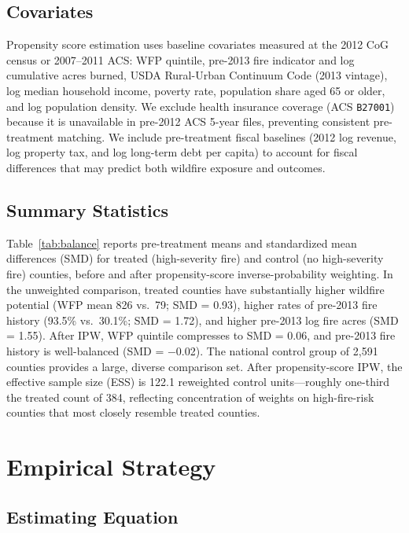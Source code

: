 \documentclass[12pt]{article}
\begin{document}
\subsection{Covariates}

Propensity score estimation uses baseline covariates measured at the 2012 CoG census
or 2007--2011 ACS: WFP quintile, pre-2013 fire indicator and log cumulative acres
burned, USDA Rural-Urban Continuum Code (2013 vintage), log median household income,
poverty rate, population share aged 65 or older, and log population density.
We exclude health insurance coverage (ACS \texttt{B27001}) because it is unavailable
in pre-2012 ACS 5-year files, preventing consistent pre-treatment matching. We
include pre-treatment fiscal baselines (2012 log revenue, log property tax, and log
long-term debt per capita) to account for fiscal differences that may predict both
wildfire exposure and outcomes.

\subsection{Summary Statistics}

Table~\ref{tab:balance} reports pre-treatment means and standardized mean differences
(SMD) for treated (high-severity fire) and control (no high-severity fire) counties,
before and after propensity-score inverse-probability weighting. In the unweighted
comparison, treated counties have substantially higher wildfire potential (WFP mean
826 vs.\ 79; SMD = 0.93), higher rates of pre-2013 fire history (93.5\% vs.\ 30.1\%;
SMD = 1.72), and higher pre-2013 log fire acres (SMD = 1.55). After IPW, WFP quintile
compresses to SMD = 0.06, and pre-2013 fire history is well-balanced (SMD = $-$0.02).
The national control group of 2,591 counties provides a large, diverse comparison
set. After propensity-score IPW, the effective sample size (ESS) is 122.1 reweighted
control units---roughly one-third the treated count of 384, reflecting concentration
of weights on high-fire-risk counties that most closely resemble treated counties.

\section{Empirical Strategy}

\subsection{Estimating Equation}
\end{document}
